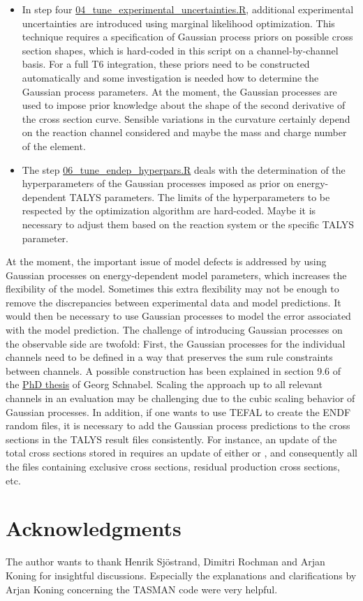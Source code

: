 \documentclass[12pt,a4paper]{scrartcl}
\begin{document}
\begin{itemize}
\item In step four \href{https://github.com/gschnabel/eval-fe56/blob/master/script/04_tune_experimental_uncertainties.R}{04\_tune\_experimental\_uncertainties.R}, additional experimental uncertainties are introduced using marginal likelihood optimization.
This technique requires a specification of Gaussian process priors on  possible cross section shapes, which is hard-coded in this script on a channel-by-channel basis.
For a full T6 integration, these priors need to be constructed automatically and some investigation is needed how to determine the Gaussian process parameters.
At the moment, the Gaussian processes are used to impose prior knowledge about the shape of the second derivative of the cross section curve.
Sensible variations in the curvature certainly depend on the reaction channel considered and maybe the mass and charge number of the element.

\item The step \href{https://github.com/gschnabel/eval-fe56/blob/master/script/06_tune_endep_hyperpars.R}{06\_tune\_endep\_hyperpars.R} deals with the determination of the hyperparameters of the Gaussian processes imposed as prior on energy-dependent TALYS parameters.
The limits of the hyperparameters to be respected by the optimization algorithm are hard-coded.
Maybe it is necessary to adjust them based on the reaction system or the specific TALYS parameter.

\end{itemize}

At the moment, the important issue of model defects is addressed by using Gaussian processes on energy-dependent model parameters, which increases the flexibility of the model.
Sometimes this extra flexibility may not be enough to remove the discrepancies between experimental data and model predictions.
It would then be necessary to use Gaussian processes to model the error associated with the model prediction.
The challenge of introducing Gaussian processes on the observable side are twofold:
First, the Gaussian processes for the individual channels need to be defined in a way that preserves the sum rule constraints between channels.
A possible construction has been explained in section 9.6 of the \href{http://www.gschnabel.com/storage/theses/201507_PhD_thesis_Georg_Schnabel.pdf}{PhD thesis} of Georg Schnabel.
Scaling the approach up to all relevant channels in an evaluation may be challenging due to the cubic scaling behavior of Gaussian processes.
In addition, if one wants to use TEFAL to create the ENDF random files, it is necessary to add the Gaussian process predictions to the cross sections in the TALYS result files consistently.
For instance, an update of the total cross sections stored in  requires an update of either  or , and consequently all the files containing exclusive cross sections, residual production cross sections, etc.

 \section{Acknowledgments}
 The author wants to thank Henrik Sjöstrand, Dimitri Rochman and Arjan Koning for insightful discussions.
 Especially the explanations and clarifications by Arjan Koning concerning the TASMAN code were very helpful.
 
 
\end{document}
